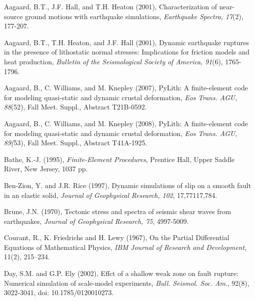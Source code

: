 \documentclass{pylithdoc}
\begin{document}
\begin{thebibliography}{Bibliography}
  
Aagaard, B.T.,
  J.F. Hall, and T.H. Heaton (2001), Characterization of near-source
  ground motions with earthquake simulations, \emph{Earthquake
    Spectra, 17}(2), 177-207.

Aagaard, B.T.,
  T.H. Heaton, and J.F. Hall (2001), Dynamic earthquake ruptures in
  the presence of lithostatic normal stresses: Implications for
  friction models and heat production, \emph{Bulletin of the
    Seismological Society of America, 91}(6), 1765-1796.

Aagaard, B., C.
  Williams, and M. Knepley (2007), PyLith: A finite-element code for
  modeling quasi-static and dynamic crustal deformation, \emph{Eos
    Trans.  AGU, 88}(52), Fall Meet. Suppl., Abstract T21B-0592.

Aagaard, B., C.
  Williams, and M. Knepley (2008), PyLith: A finite-element code for
  modeling quasi-static and dynamic crustal deformation, \emph{Eos
    Trans.  AGU}, \emph{89(}53), Fall Meet. Suppl., Abstract
  T41A-1925.

Bathe, K.-J. (1995),
  \textit{Finite-Element Procedures}, Prentice Hall, Upper Saddle
  River, New Jersey, 1037 pp.

Ben-Zion, Y.  and
  J.R. Rice (1997), Dynamic simulations of slip on a smooth fault in
  an elastic solid, \emph{Journal of Geophysical Research}\textit{,
    102}, 17,771\textendash{}17,784.

Brune, J.N. (1970), Tectonic stress
  and spectra of seismic shear waves from earthquakes, \emph{Journal
    of Geophysical Research, 75}, 4997-5009.

Courant, R., K.
  Friedrichs and H. Lewy (1967), On the Partial Differential Equations
  of Mathematical Physics, \textit{IBM Journal of Research and
    Development}, 11(2), 215--234.

Day, S.M. and G.P. Ely
  (2002), Effct of a shallow weak zone on fault rupture: Numerical
  simulation of scale-model experiments,
  \textit{Bull. Seismol. Soc. Am.}, 92(8), 3022-3041, doi:
  10.1785/0120010273.


\end{thebibliography}
\end{document}
